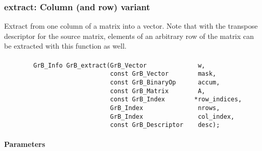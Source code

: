 





\subsubsection{{\sf extract}: Column (and row) variant}

Extract from one column of a matrix into a vector.  Note that with the transpose
descriptor for the source matrix, elements of an arbitrary row of the matrix
can be extracted with this function as well.

\paragraph{\syntax}

\begin{verbatim}
        GrB_Info GrB_extract(GrB_Vector              w,
                             const GrB_Vector        mask,
                             const GrB_BinaryOp      accum,
                             const GrB_Matrix        A,
                             const GrB_Index        *row_indices,
                             GrB_Index               nrows,
                             GrB_Index               col_index,
                             const GrB_Descriptor    desc);
\end{verbatim}

\paragraph{Parameters}

